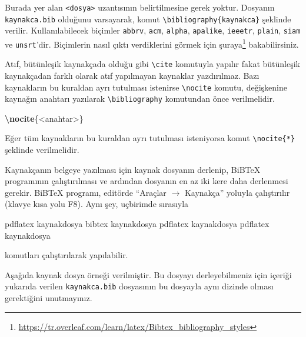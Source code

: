 \documentclass[
  10pt,
]{scrbook}
\newenvironment{Shaded}{\begin{snugshade}}{\end{snugshade}}
\newcommand{\ExtensionTok}[1]{#1}
\newcommand{\KeywordTok}[1]{\textcolor[rgb]{0.13,0.29,0.53}{\textbf{#1}}}
\newcommand{\NormalTok}[1]{#1}
\renewcommand{\href}[2]{#2\footnote{\url{#1}}}
\theoremstyle{definition}
\theoremstyle{definition}
\theoremstyle{definition}
\theoremstyle{definition}
\theoremstyle{remark}
\begin{document}
Burada yer alan \texttt{\textless{}dosya\textgreater{}} uzantısının belirtilmesine gerek yoktur. Dosyanın \texttt{kaynakca.bib} olduğunu varsayarak, komut \texttt{\textbackslash{}bibliography\{kaynakca\}} şeklinde verilir. Kullanılabilecek biçimler \texttt{abbrv}, \texttt{acm}, \texttt{alpha}, \texttt{apalike}, \texttt{ieeetr}, \texttt{plain}, \texttt{siam} ve \texttt{unsrt}'dir. Biçimlerin nasıl çıktı verdiklerini görmek için \href{https://tr.overleaf.com/learn/latex/Bibtex_bibliography_styles}{şuraya} bakabilirsiniz.

Atıf, bütünleşik kaynakçada olduğu gibi \texttt{\textbackslash{}cite} komutuyla yapılır fakat bütünleşik kaynakçadan farklı olarak atıf yapılmayan kaynaklar yazdırılmaz. Bazı kaynakların bu kuraldan ayrı tutulması istenirse \texttt{\textbackslash{}nocite} komutu, değişkenine kaynağın anahtarı yazılarak \texttt{\textbackslash{}bibliography} komutundan önce verilmelidir.

\begin{Shaded}
\begin{Highlighting}[]
\KeywordTok{\textbackslash{}nocite}\NormalTok{\{}\ExtensionTok{\textless{}anahtar\textgreater{}}\NormalTok{\}}
\end{Highlighting}
\end{Shaded}

Eğer tüm kaynakların bu kuraldan ayrı tutulması isteniyorsa komut \texttt{\textbackslash{}nocite\{*\}} şeklinde verilmelidir.

Kaynakçanın belgeye yazılması için kaynak dosyanın derlenip, BiBTeX programının çalıştırılması ve ardından dosyanın en az iki kere daha derlenmesi gerekir. BiBTeX programı, editörde ``Araçlar \(\rightarrow\) Kaynakça'' yoluyla çalıştırılır (klavye kısa yolu F8). Aynı şey, uçbirimde sırasıyla

\begin{Shaded}
\begin{Highlighting}[]
\ExtensionTok{pdflatex}\NormalTok{ kaynakdosya}
\ExtensionTok{bibtex}\NormalTok{ kaynakdosya}
\ExtensionTok{pdflatex}\NormalTok{ kaynakdosya}
\ExtensionTok{pdflatex}\NormalTok{ kaynakdosya}
\end{Highlighting}
\end{Shaded}

komutları çalıştırılarak yapılabilir.

Aşağıda kaynak dosya örneği verilmiştir. Bu dosyayı derleyebilmeniz için içeriği yukarıda verilen \texttt{kaynakca.bib} dosyasının bu dosyayla aynı dizinde olması gerektiğini unutmayınız.
\end{document}
